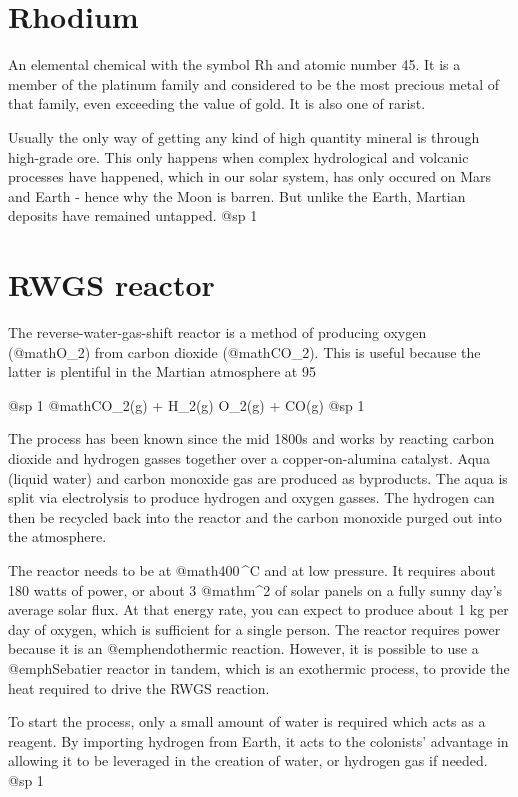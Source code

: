 \section{Rhodium}
An elemental chemical with the symbol Rh and atomic number 45. It is a member of the platinum family and considered to be the most precious metal of that family, even exceeding the value of gold. It is also one of rarist. 

Usually the only way of getting any kind of high quantity mineral is through high-grade ore. This only happens when complex hydrological and volcanic processes have happened, which in our solar system, has only occured on Mars and Earth - hence why the Moon is barren. But unlike the Earth, Martian deposits have remained untapped.
@sp 1

\section{RWGS reactor}
The reverse-water-gas-shift reactor is a method of producing oxygen (@math{O_2}) from carbon dioxide (@math{CO_2}). This is useful because the latter is plentiful in the Martian atmosphere at 95 %

@sp 1
@math{CO_2(g) + H_2(g) \rightarrow O_2(g) + CO(g)}
@sp 1

The process has been known since the mid 1800s and works by reacting carbon dioxide and hydrogen gasses together over a copper-on-alumina catalyst. Aqua (liquid water) and carbon monoxide gas are produced as byproducts. The aqua is split via electrolysis to produce hydrogen and oxygen gasses. The hydrogen can then be recycled back into the reactor and the carbon monoxide purged out into the atmosphere.

The reactor needs to be at @math{400\,^{\circ}{\rm C}} and at low pressure. It requires about 180 watts of power, or about 3 @math{m^2} of solar panels on a fully sunny day's average solar flux. At that energy rate, you can expect to produce about 1 kg per day of oxygen, which is sufficient for a single person. The reactor requires power because it is an @emph{endothermic reaction}. However, it is possible to use a @emph{Sebatier reactor} in tandem, which is an exothermic process, to provide the heat required to drive the RWGS reaction.

To start the process, only a small amount of water is required which acts as a reagent. By importing hydrogen from Earth, it acts to the colonists' advantage in allowing it to be leveraged in the creation of water, or hydrogen gas if needed.
@sp 1


